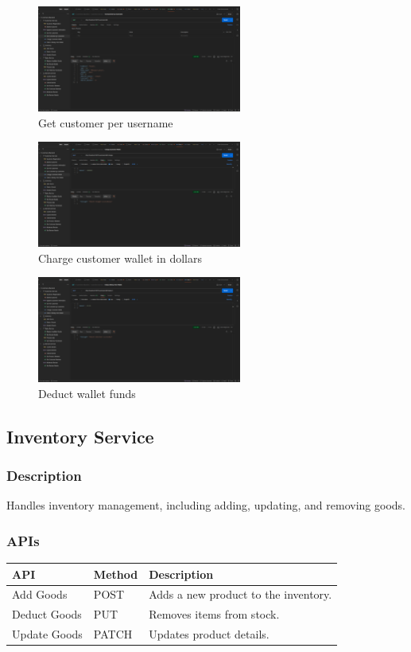 \documentclass[a4paper,12pt]{article}
\begin{document}
\begin{figure}[H]
  \centering
  \includegraphics[width=0.6\textwidth]{images/5.png}
  \caption{Get customer per username}
\end{figure}
\begin{figure}[H]
  \centering
  \includegraphics[width=0.6\textwidth]{images/6.png}
  \caption{Charge customer wallet in dollars}
\end{figure}
\begin{figure}[H]
  \centering
  \includegraphics[width=0.6\textwidth]{images/7.png}
  \caption{Deduct wallet funds}
\end{figure}
\subsection{Inventory Service}
\subsubsection{Description}
Handles inventory management, including adding, updating, and removing goods.

\subsubsection{APIs}
\begin{longtable}{|p{4cm}|p{2cm}|p{7cm}|}
\hline
\textbf{API} & \textbf{Method} & \textbf{Description} \\
\hline
Add Goods & POST & Adds a new product to the inventory. \\
\hline
Deduct Goods & PUT & Removes items from stock. \\
\hline
Update Goods & PATCH & Updates product details. \\
\hline
\end{longtable}
\end{document}
